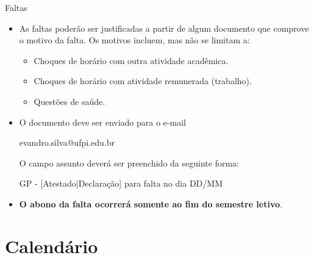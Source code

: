 \documentclass{beamer}
\begin{document}
\begin{frame}{Faltas}
    \begin{itemize}
        \justifying
        \item As faltas poderão ser justificadas a partir de algum documento que comprove o motivo da falta. Os motivos incluem, mas não se limitam a:
            \begin{itemize}
                \justifying
                \item Choques de horário com outra atividade acadêmica.
                \item Choques de horário com atividade remunerada (trabalho).
                \item Questões de saúde.
            \end{itemize}
        \item O documento deve ser enviado para o e-mail\\ 
        \begin{center} evandro.silva@ufpi.edu.br \end{center}
        O campo assunto deverá ser preenchido da seguinte forma:\\ 
        \begin{center} GP - [Atestado$|$Declaração] para falta no dia DD/MM \end{center}
        \item \alert{\textbf{O abono da falta ocorrerá somente ao fim do semestre letivo}}.
    \end{itemize}
\end{frame}


\section{Calendário}
\end{document}
